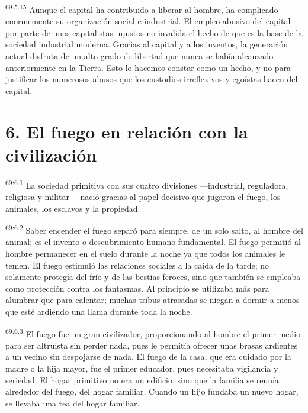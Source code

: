 \documentclass[twoside, 11pt]{book}
\begin{document}
\par
\textsuperscript{69:5.15} Aunque el capital ha contribuido a liberar al hombre, ha complicado enormemente su organización social e industrial. El empleo abusivo del capital por parte de unos capitalistas injustos no invalida el hecho de que es la base de la sociedad industrial moderna. Gracias al capital y a los inventos, la generación actual disfruta de un alto grado de libertad que nunca se había alcanzado anteriormente en la Tierra. Esto lo hacemos constar como un hecho, y no para justificar los numerosos abusos que los custodios irreflexivos y egoístas hacen del capital.

\section*{6. El fuego en relación con la civilización}
\par
\textsuperscript{69:6.1} La sociedad primitiva con sus cuatro divisiones ---industrial, reguladora, religiosa y militar--- nació gracias al papel decisivo que jugaron el fuego, los animales, los esclavos y la propiedad.

\par
\textsuperscript{69:6.2} Saber encender el fuego separó para siempre, de un solo salto, al hombre del animal; es el invento o descubrimiento humano fundamental. El fuego permitió al hombre permanecer en el suelo durante la noche ya que todos los animales le temen. El fuego estimuló las relaciones sociales a la caída de la tarde; no solamente protegía del frío y de las bestias feroces, sino que también se empleaba como protección contra los fantasmas. Al principio se utilizaba más para alumbrar que para calentar; muchas tribus atrasadas se niegan a dormir a menos que esté ardiendo una llama durante toda la noche.

\par
\textsuperscript{69:6.3} El fuego fue un gran civilizador, proporcionando al hombre el primer medio para ser altruista sin perder nada, pues le permitía ofrecer unas brasas ardientes a un vecino sin despojarse de nada. El fuego de la casa, que era cuidado por la madre o la hija mayor, fue el primer educador, pues necesitaba vigilancia y seriedad. El hogar primitivo no era un edificio, sino que la familia se reunía alrededor del fuego, del hogar familiar. Cuando un hijo fundaba un nuevo hogar, se llevaba una tea del hogar familiar.
\end{document}
